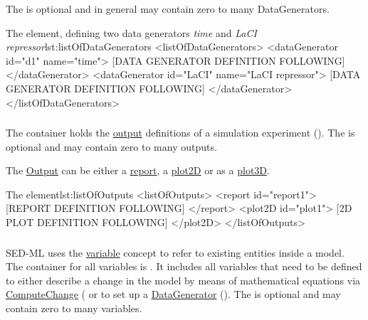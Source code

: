 The  is optional and in general may contain zero to many DataGenerators. 



\begin{myXmlLst}{The  element, defining two data generators \emph{time} and \emph{LaCI repressor}}{lst:listOfDataGenerators}
<listOfDataGenerators>
	<dataGenerator id="d1" name="time">
		[DATA GENERATOR DEFINITION FOLLOWING]
	</dataGenerator>
	<dataGenerator id="LaCI" name="LaCI repressor">
		[DATA GENERATOR DEFINITION FOLLOWING]
	</dataGenerator>
</listOfDataGenerators>
\end{myXmlLst}


\subsubsection{}
\label{sec:listOfOutputs}
The  container holds the \hyperref[class:output]{output} definitions of a simulation experiment (). The  is optional and may contain zero to many outputs.

The \hyperref[class:output]{Output} can be either a \hyperref[class:report]{report}, a \hyperref[class:plot2D]{plot2D} or as a \hyperref[class:plot3D]{plot3D}. 

\begin{myXmlLst}{The  element}{lst:listOfOutputs}
<listOfOutputs>
	<report id="report1">
		[REPORT DEFINITION FOLLOWING]
	</report>
	<plot2D id="plot1">
		[2D PLOT DEFINITION FOLLOWING] 
	</plot2D>
</listOfOutputs>
\end{myXmlLst}


\subsubsection{}
\label{sec:listOfVariables}
SED-ML uses the \hyperref[class:variable]{variable} concept to refer to existing entities inside a model. The container for all variables is  . It includes all variables that need to be defined to either describe a change in the model by means of mathematical equations via \hyperref[class:computeChange]{ComputeChange} ( or to set up a \hyperref[class:dataGenerator]{DataGenerator} (). The  is optional and may contain zero to many variables. 


